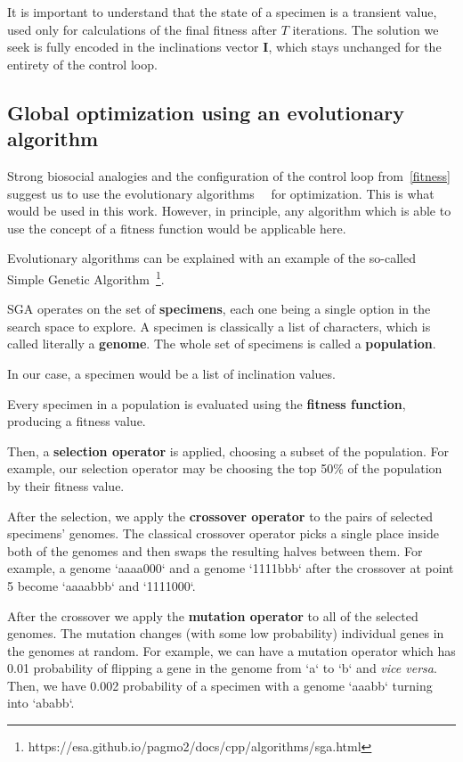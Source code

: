 \documentclass[11pt, a4paper]{article}
\begin{document}
  It is important to understand that the state of a specimen is a transient value, used only for calculations of the final fitness after $T$ iterations.
  The solution we seek is fully encoded in the inclinations vector $\mathbf{I}$, which stays unchanged for the entirety of the control loop.

	\subsection{Global optimization using an evolutionary algorithm}\label{section::evolutionary}

	Strong biosocial analogies and the configuration of the control loop from~\ref{fitness} suggest us to use the evolutionary algorithms~\cite{song2023rl_ea}~\cite{beyer2002evolution_strategies} for optimization.
	This is what would be used in this work.
	However, in principle, any algorithm which is able to use the concept of a fitness function would be applicable here.

  Evolutionary algorithms can be explained with an example of the so-called Simple Genetic Algorithm~\footnote{https://esa.github.io/pagmo2/docs/cpp/algorithms/sga.html}.

  SGA operates on the set of \textbf{specimens}, each one being a single option in the search space to explore.
  A specimen is classically a list of characters, which is called literally a \textbf{genome}.
  The whole set of specimens is called a \textbf{population}.

  In our case, a specimen would be a list of inclination values.

  Every specimen in a population is evaluated using the \textbf{fitness function}, producing a fitness value.

  Then, a \textbf{selection operator} is applied, choosing a subset of the population.
  For example, our selection operator may be choosing the top 50\% of the population by their fitness value.

  After the selection, we apply the \textbf{crossover operator} to the pairs of selected specimens' genomes.
  The classical crossover operator picks a single place inside both of the genomes and then swaps the resulting halves between them.
  For example, a genome `aaaa000` and a genome `1111bbb` after the crossover at point 5 become `aaaabbb` and `1111000`.

  After the crossover we apply the \textbf{mutation operator} to all of the selected genomes.
  The mutation changes (with some low probability) individual genes in the genomes at random.
  For example, we can have a mutation operator which has 0.01 probability of flipping a gene in the genome from `a` to `b` and \textit{vice versa}.
  Then, we have 0.002 probability of a specimen with a genome `aaabb` turning into `ababb`.
\end{document}
